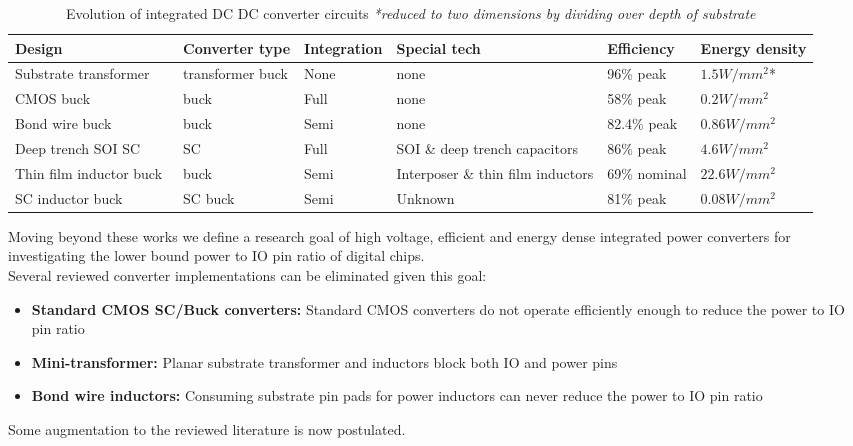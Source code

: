\documentclass[letterpaper,twocolumn,10pt]{article}
\begin{document}
\begin{table}[t]
\centering
    \begin{tabular}{|l|l|l|l|l|l|}
    \hline
    Design                  & Converter type           & Integration & Special tech                         & Efficiency   & Energy density \\ \hline
    Substrate transformer~\cite{Gong2008}   &  transformer buck & None        & none                                 & 96\% peak    & $1.5W/mm^2$*    \\ \hline
    CMOS buck~\cite{Wens2011}               & buck                     & Full        & none                                 & 58\% peak    & $0.2W/mm^2$     \\ \hline
    Bond wire buck~\cite{ChengII2013}           & buck                     & Semi        & none                                 & 82.4\% peak  & $0.86W/mm^2$    \\ \hline
    Deep trench SOI SC~\cite{Andersen2013} & SC                     & Full        & SOI \& deep trench capacitors & 86\% peak & $4.6W/mm^2$    \\ \hline
    Thin film inductor buck~\cite{Sturcken2013} & buck                     & Semi        & Interposer \& thin film inductors & 69\% nominal & $22.6W/mm^2$    \\ \hline
    SC inductor buck~\cite{Pilawa2012}        & SC buck           & Semi        & Unknown                              & 81\% peak    & $0.08W/mm^2$    \\ \hline    
    \end{tabular}
    \caption{Evolution of integrated DC DC converter circuits \textit{*reduced to two dimensions by dividing over depth of substrate}}
    \label{EffnEnergyDensity}
\end{table}
Moving beyond these works we define a research goal of high voltage, efficient and energy dense integrated power converters for investigating the lower bound power to IO pin ratio of digital chips.\\
Several reviewed converter implementations can be eliminated given this goal:
\begin{itemize}
\item{\textbf{Standard CMOS SC/Buck converters: }Standard CMOS converters do not operate efficiently enough to reduce the power to IO pin ratio}
\item{\textbf{Mini-transformer: }Planar substrate transformer and inductors block both IO and power pins }
\item{\textbf{Bond wire inductors: }Consuming substrate pin pads for power inductors can never reduce the power to IO pin ratio}
\end{itemize}   
Some augmentation to the reviewed literature is now postulated.\\
\end{document}
